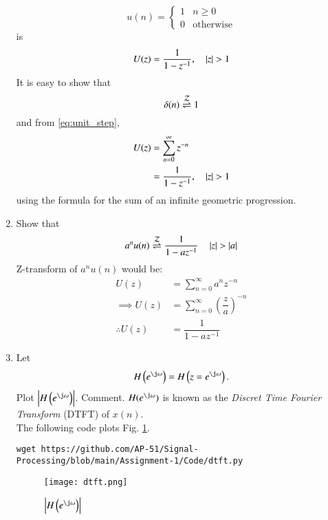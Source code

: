 \documentclass[journal,12pt,twocolumn]{IEEEtran}
\renewcommand\thesection{\arabic{section}}
\begin{document}
\begin{enumerate}[label=\thesection.\arabic*]
\begin{equation}
\label{eq:unit_step}
u(n)
=
\begin{cases}
1 & n \ge 0
\\
0 & \text{otherwise}
\end{cases}
\end{equation}
is
\begin{equation}
U(z) = \frac{1}{1-z^{-1}}, \quad \left\vert z\right\vert > 1
\end{equation}
\solution It is easy to show that
\begin{equation}
\delta(n) \overset{\mathcal{Z}}{ \rightleftharpoons} 1
\end{equation}
and from \eqref{eq:unit_step},
\begin{align}
U(z) &= \sum _{n= 0}^{\infty}z^{-n}
\\
&=\frac{1}{1-z^{-1}}, \quad \left\vert z\right\vert > 1
\end{align}
using the formula for the sum of an infinite geometric progression.
%
\item Show that 
\begin{equation}
\label{eq:anun}
a^nu(n) \overset{\mathcal{Z}}{ \rightleftharpoons} \frac{1}{1-az^{-1}} \quad \left\vert z\right\vert > \left\vert a\right\vert
\end{equation}
\solution Z-transform of $a^nu(n)$ would be:
\begin{align}
    U(z) &= \sum _{n= 0}^{\infty}a^nz^{-n}\\
    \implies U(z) &= \sum _{n= 0}^{\infty}(\dfrac{z}{a})^{-n}\\
    \therefore U(z) &=\dfrac{1}{1-az^{-1}}
\end{align}
%
\item 
Let
\begin{equation}
H\brak{e^{\j \omega}} = H\brak{z = e^{\j \omega}}.
\end{equation}
Plot $\abs{H\brak{e^{\j \omega}}}$.  Comment.  $H(e^{\j \omega})$ is
known as the {\em Discret Time Fourier Transform} (DTFT) of $x(n)$.
\\
\solution The following code plots Fig. \ref{fig:dtft}.
\begin{lstlisting}
wget https://github.com/AP-51/Signal-Processing/blob/main/Assignment-1/Code/dtft.py
\end{lstlisting}
\begin{figure}[!ht]
\centering
\texttt{[image: dtft.png]}
\caption{$\abs{H\brak{e^{\j\omega}}}$}
\label{fig:dtft}
\end{figure}
\end{enumerate}
\end{document}
